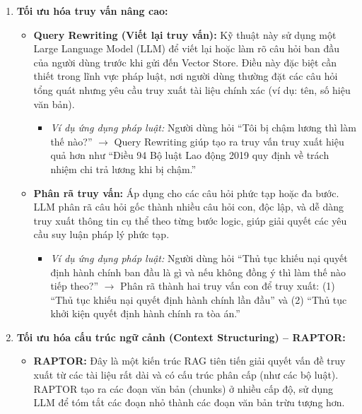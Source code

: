 \begin{enumerate}
    \item \textbf{Tối ưu hóa truy vấn nâng cao:}

    \begin{itemize}
        \item \textbf{Query Rewriting (Viết lại truy vấn):} Kỹ thuật này sử dụng một Large Language
        Model (LLM) để viết lại hoặc làm rõ câu hỏi ban đầu của người dùng trước khi gửi
        đến Vector Store. Điều này đặc biệt cần thiết trong lĩnh vực pháp luật, nơi người
        dùng thường đặt các câu hỏi tổng quát nhưng yêu cầu truy xuất tài liệu chính xác
        (ví dụ: tên, số hiệu văn bản).

        \begin{itemize}
            \item \textit{Ví dụ ứng dụng pháp luật:} Người dùng hỏi ``Tôi bị chậm lương thì làm thế nào?''
            $\rightarrow$ Query Rewriting giúp tạo ra truy vấn truy xuất hiệu quả hơn như ``Điều 94
            Bộ luật Lao động 2019 quy định về trách nhiệm chi trả lương khi bị chậm.''
        \end{itemize}

        \item \textbf{Phân rã truy vấn:} Áp dụng cho các câu hỏi phức tạp hoặc đa bước. LLM phân rã
        câu hỏi gốc thành nhiều câu hỏi con, độc lập, và dễ dàng truy xuất thông tin cụ thể
        theo từng bước logic, giúp giải quyết các yêu cầu suy luận pháp lý phức tạp.

        \begin{itemize}
            \item \textit{Ví dụ ứng dụng pháp luật:} Người dùng hỏi ``Thủ tục khiếu nại quyết định hành
            chính ban đầu là gì và nếu không đồng ý thì làm thế nào tiếp theo?'' $\rightarrow$ Phân
            rã thành hai truy vấn con để truy xuất: (1) ``Thủ tục khiếu nại quyết định hành
            chính lần đầu'' và (2) ``Thủ tục khởi kiện quyết định hành chính ra tòa án.''
        \end{itemize}
    \end{itemize}

    \item \textbf{Tối ưu hóa cấu trúc ngữ cảnh (Context Structuring) -- RAPTOR:}

    \begin{itemize}
        \item \textbf{RAPTOR:} Đây là một kiến trúc RAG tiên tiến giải quyết vấn đề truy xuất từ các
        tài liệu rất dài và có cấu trúc phân cấp (như các bộ luật). RAPTOR tạo ra các đoạn
        văn bản (chunks) ở nhiều cấp độ, sử dụng LLM để tóm tắt các đoạn nhỏ thành các
        đoạn văn bản trừu tượng hơn.
    \end{itemize}


\end{enumerate}
